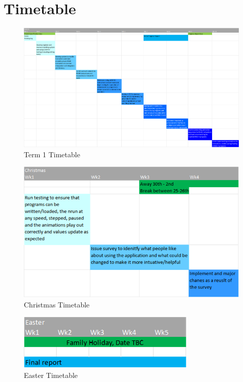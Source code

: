 \documentclass[a4paper,fleqn,12pt]{article}
\begin{document}
\section{Timetable}



\begin{figure}[H]
    \centering
    \includegraphics[angle=90, scale=0.68]{specification/t1.png}
    \caption{Term 1 Timetable}
    \label{fig:timetable_t1}
\end{figure}
\begin{figure}[H]
    \centering
    \includegraphics[scale=0.65]{specification/christmas.png}
    \caption{Christmas Timetable}
    \label{fig:timetable_christmas}
\end{figure}
\begin{figure}[H]
    \centering
    \includegraphics[scale=0.85]{specification/easter.png}
    \caption{Easter Timetable}
    \label{fig:timetable_easter}
\end{figure}
\end{document}
